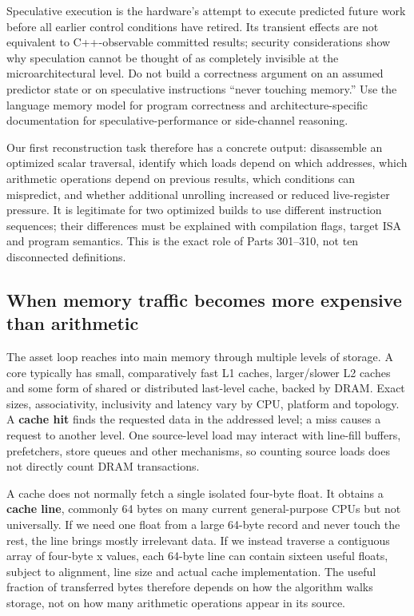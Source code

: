 Speculative execution is the hardware's attempt to execute predicted future work before all earlier control conditions have retired. Its transient effects are not equivalent to C++-observable committed results; security considerations show why speculation cannot be thought of as completely invisible at the microarchitectural level. Do not build a correctness argument on an assumed predictor state or on speculative instructions ``never touching memory.'' Use the language memory model for program correctness and architecture-specific documentation for speculative-performance or side-channel reasoning.

Our first reconstruction task therefore has a concrete output: disassemble an optimized scalar traversal, identify which loads depend on which addresses, which arithmetic operations depend on previous results, which conditions can mispredict, and whether additional unrolling increased or reduced live-register pressure. It is legitimate for two optimized builds to use different instruction sequences; their differences must be explained with compilation flags, target ISA and program semantics. This is the exact role of Parts 301--310, not ten disconnected definitions.

\subsection{When memory traffic becomes more expensive than arithmetic}\label{05-engine-i-ch007-when-memory-traffic-becomes-more-expensive-than-arithmetic}

The asset loop reaches into main memory through multiple levels of storage. A core typically has small, comparatively fast L1 caches, larger/slower L2 caches and some form of shared or distributed last-level cache, backed by DRAM. Exact sizes, associativity, inclusivity and latency vary by CPU, platform and topology. A \textbf{cache hit} finds the requested data in the addressed level; a miss causes a request to another level. One source-level load may interact with line-fill buffers, prefetchers, store queues and other mechanisms, so counting source loads does not directly count DRAM transactions.

A cache does not normally fetch a single isolated four-byte float. It obtains a \textbf{cache line}, commonly 64 bytes on many current general-purpose CPUs but not universally. If we need one float from a large 64-byte record and never touch the rest, the line brings mostly irrelevant data. If we instead traverse a contiguous array of four-byte x values, each 64-byte line can contain sixteen useful floats, subject to alignment, line size and actual cache implementation. The useful fraction of transferred bytes therefore depends on how the algorithm walks storage, not on how many arithmetic operations appear in its source.

